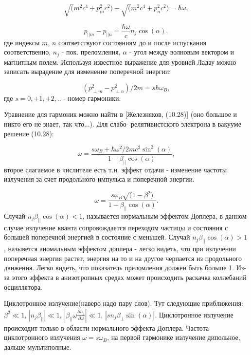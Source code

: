 \documentclass[10pt, a4paper]{article}
\begin{document}
\begin{equation}
    \sqrt(m^2c^4+p_m^2c^2) - \sqrt(m^2c^4+p_n^2c^2)=\hbar \omega,
\end{equation}

\begin{equation}
    p_{|| m} - p_{|| n} = \frac{\hbar\omega}{c}n_j \cos(\alpha),
\end{equation}
где индексы $m$, $n$ соответствуют состояниям до и после испускания соответственно, $n_j$ - пок. преломления, $\alpha$ -
угол между волновым вектором и магнитным полем. Используя известное выражение для уровней Ладау можно записать вырадение
для изменение поперечной энергии:

\begin{equation}
    (p_{\perp m}^2 - p_{\perp n}^2)/2m = s\hbar\omega_B,
\end{equation}
где $s = 0, \pm1, \pm2, ..$ - номер гармоники.

Уравнение для гармоник можно найти в [Железняков, (10.28)] (оно большое и никто его не знает, так что...). Для слабо-
релятивистского электрона в вакууме решение (10.28):

\begin{equation}
    \omega = \frac{s\omega_B + \hbar \omega^2/2mc^2 \sin^2(\alpha)}{1-\beta_{||}\cos(\alpha)},
\end{equation}
второе слагаемое в числителе есть т.н. эффект отдачи - изменение частоты излучения за счет продольного импульса и
поперечной энергии.

\begin{equation}
    \omega = \frac{s\omega_B \sqrt(1-\beta^2)}{1-\beta_{||}\cos(\alpha)}.
\end{equation}
Случай $n_j\beta_{||}\cos(\alpha)<1$, называется нормальным эффектом Доплера, в данном случае излучение кванта
сопровождается переходом частицы и состояния с большей поперечной энергией в состояние с меньшей. Случай $n_j\beta_{||}\cos(\alpha)>1$,
назывется аномальным эффектом доплера - легко видеть, что при излучении поперечная энергия растет, энергия на то и на 
другое черпается из продольного движения. Легко видеть, что показатель преломления должен быть больше 1.
Из-за этого эффекта в анизотропных средах может происходить раскачка коллебаний осциллятора.

Циклотронное излучение(наверо надо пару слов). Тут следующие приближения: $\beta^2\ll1$, $|n_j\beta_{||}|\ll1$,
$|\beta_{||}\omega\frac{\partial n_j}{\partial \omega}|\ll1$, $|sn_j\beta_{\perp}\sin(\alpha)|$. Циклотронное 
излучение происходит только в области нормального эффекта Доплера. Частота циклотронного излучения $\omega=s\omega_B$,
на первой гармонике излучение дипольное, дальше мультиполные.
\end{document}
